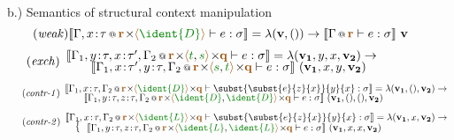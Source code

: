 \begin{figure}[t]
{\small b.) Semantics of structural context manipulation}
\begin{equation*}
\tag{\emph{weak}}
\sem{\coctx{\Gamma,x \!:\! \tau}{\aclrd{\textbf{r}} \cons \alift{ \cclrd{\ident{D}} }} \vdash e : \sigma} = 
  \lambda(\textbf{v}, ()) \rightarrow
    \sem{\coctx{\Gamma}{ \aclrd{\textbf{r}} } \vdash e : \sigma}~\textbf{v}
\end{equation*}
\begin{equation*}
\hspace{-0.5em}
\tag{\emph{exch}}
\begin{array}{l}
\sem{\coctx{\Gamma_1,y\!:\!\tau,x\!:\!\tau',\Gamma_2}{\aclrd{\textbf{r}} \cons\alift{\cclrd{t},\cclrd{s}} \cons \aclrd{\textbf{q}}} \vdash e : \sigma} = 
  \lambda(\mathbf{v_1}, y, x, \mathbf{v_2}) \rightarrow\\[-0.25em]
\qquad
  \sem{\coctx{\Gamma_1,x\!:\!\tau',y\!:\!\tau,\Gamma_2}{\aclrd{\textbf{r}} \cons\alift{\cclrd{s},\cclrd{t}} \cons \aclrd{\textbf{q}}} \vdash e : \sigma}~
  (\mathbf{v_1}, x, y, \mathbf{v_2})
\end{array}
\end{equation*}
\begin{equation*}
\hspace{-0.5em}
\tag{\emph{contr-1}}
\begin{array}{l}
\sem{\coctx{\Gamma_1,x\!:\!\tau,\Gamma_2}{\aclrd{\textbf{r}} \cons \alift{\cclrd{\ident{D}}} \cons \aclrd{\textbf{q}}} \vdash \subst{\subst{e}{z}{x}}{y}{x} : \sigma} = \lambda(\mathbf{v_1}, (), \mathbf{v_2}) \rightarrow \\[-0.25em]
\qquad\sem{\coctx{\Gamma_1,y\!:\!\tau,z\!:\!\tau,\Gamma_2}{\aclrd{\textbf{r}} \cons \alift{\cclrd{\ident{D}},\cclrd{\ident{D}}} \cons \aclrd{\textbf{q}}} \vdash e : \sigma} ~(\mathbf{v_1}, (), (), \mathbf{v_2})
\end{array}
\end{equation*}
\begin{equation*}
\hspace{-0.5em}
\tag{\emph{contr-2}}
\begin{array}{l}
\sem{\coctx{\Gamma_1,x\!:\!\tau,\Gamma_2}{\aclrd{\textbf{r}} \cons \alift{\cclrd{\ident{L}}} \cons \aclrd{\textbf{q}}} \vdash \subst{\subst{e}{z}{x}}{y}{x} : \sigma} = \lambda(\mathbf{v_1}, x, \mathbf{v_2}) \rightarrow \\[-0.25em]
\quad\begin{cases}
~~\sem{\coctx{\Gamma_1,y\!:\!\tau,z\!:\!\tau,\Gamma_2}{\aclrd{\textbf{r}} \cons \alift{\cclrd{\ident{L}},\cclrd{\ident{L}}} \cons \aclrd{\textbf{q}}} \vdash e : \sigma}~(\mathbf{v_1}, x, x, \mathbf{v_2})\\[-0.25em]

\end{cases}
\end{array}
\end{equation*}
\end{figure}
